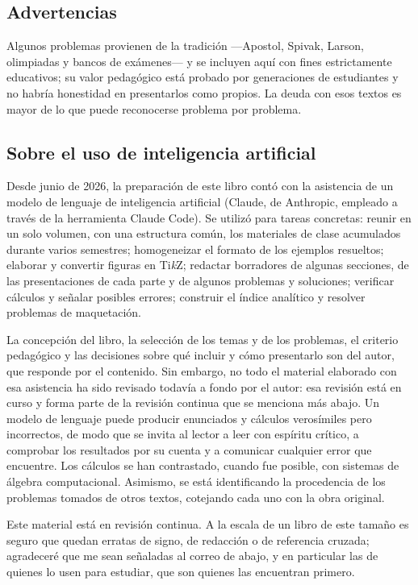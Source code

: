 \documentclass[12pt, fleqn, leqno]{book}
\theoremstyle{plain}
\theoremstyle{definition}
\begin{document}
\subsection*{Advertencias}

Algunos problemas provienen de la tradición ---Apostol, Spivak, Larson, olimpiadas y bancos de exámenes--- y se incluyen aquí con fines estrictamente educativos; su valor pedagógico está probado por generaciones de estudiantes y no habría honestidad en presentarlos como propios. La deuda con esos textos es mayor de lo que puede reconocerse problema por problema.

\subsection*{Sobre el uso de inteligencia artificial}

Desde junio de 2026, la preparación de este libro contó con la asistencia de un modelo de lenguaje de inteligencia artificial (Claude, de Anthropic, empleado a través de la herramienta Claude Code). Se utilizó para tareas concretas: reunir en un solo volumen, con una estructura común, los materiales de clase acumulados durante varios semestres; homogeneizar el formato de los ejemplos resueltos; elaborar y convertir figuras en Ti\emph{k}Z; redactar borradores de algunas secciones, de las presentaciones de cada parte y de algunos problemas y soluciones; verificar cálculos y señalar posibles errores; construir el índice analítico y resolver problemas de maquetación.

La concepción del libro, la selección de los temas y de los problemas, el criterio pedagógico y las decisiones sobre qué incluir y cómo presentarlo son del autor, que responde por el contenido. Sin embargo, no todo el material elaborado con esa asistencia ha sido revisado todavía a fondo por el autor: esa revisión está en curso y forma parte de la revisión continua que se menciona más abajo. Un modelo de lenguaje puede producir enunciados y cálculos verosímiles pero incorrectos, de modo que se invita al lector a leer con espíritu crítico, a comprobar los resultados por su cuenta y a comunicar cualquier error que encuentre. Los cálculos se han contrastado, cuando fue posible, con sistemas de álgebra computacional. Asimismo, se está identificando la procedencia de los problemas tomados de otros textos, cotejando cada uno con la obra original.

Este material está en revisión continua. A la escala de un libro de este tamaño es seguro que quedan erratas de signo, de redacción o de referencia cruzada; agradeceré que me sean señaladas al correo de abajo, y en particular las de quienes lo usen para estudiar, que son quienes las encuentran primero.
\end{document}
